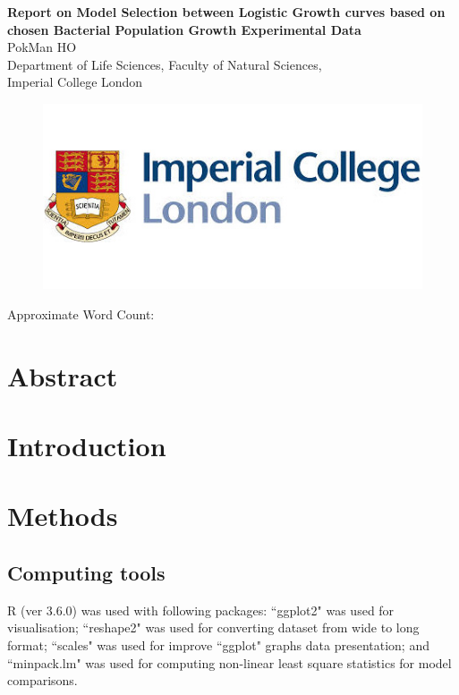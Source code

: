 \documentclass[a4paper, 11pt]{article}
\title{\ReportTitle}
\author{\ReportAuthor (CID: 01786076)}
\date{}
\newcommand{\ReportTitle}{Report on Model Selection between Logistic Growth curves based on chosen Bacterial Population Growth Experimental Data} %
\newcommand{\ReportAuthor}{PokMan HO}
\newcommand{\ReportAffil}{Department of Life Sciences, Faculty of Natural Sciences,\\Imperial College London}
\begin{document}
	\begin{center}
		\Huge\textbf{\ReportTitle}\\
		\LARGE\ReportAuthor\\
		\Large\ReportAffil
	\end{center}
	\begin{figure}[h]
		\centering\includegraphics[width=\linewidth]{icl.jpg}
	\end{figure}
	\begin{flushright}
		\Large Approximate Word Count: %
	\end{flushright}
	\clearpage
	
	\maketitle
	\section*{Abstract}
	
	
	\section*{Introduction}
	
	\section*{Methods}

	\subsection*{Computing tools}
	R (ver 3.6.0)\autocite{Rcore} was used with following packages: ``ggplot2"\autocite{ggplot2} was used for visualisation; ``reshape2"\autocite{reshape2} was used for converting dataset from wide to long format; ``scales"\autocite{scales} was used for improve ``ggplot" graphs data presentation; and ``minpack.lm"\autocite{minpacklm} was used for computing non-linear least square statistics for model comparisons.
	
\end{document}
